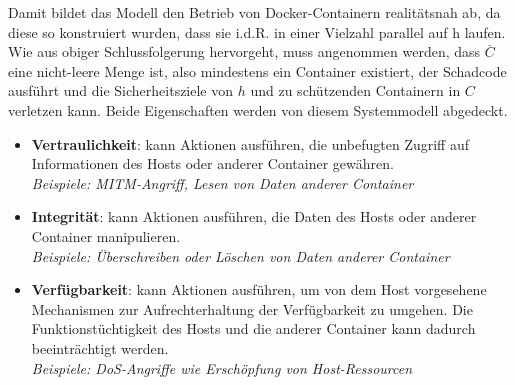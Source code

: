 \documentclass[../main.tex]{subfiles}
\begin{document}
    Damit bildet das Modell den Betrieb von Docker-Containern realitätsnah ab, da diese so konstruiert wurden, dass sie i.d.R. in einer Vielzahl parallel auf h laufen. Wie aus obiger Schlussfolgerung hervorgeht, muss angenommen werden, dass \(\overline{C}\) eine nicht-leere Menge ist, also mindestens ein Container \cbroken{} existiert, der Schadcode ausführt und die Sicherheitsziele von \(h\) und zu schützenden Containern in \(C\) verletzen kann. Beide Eigenschaften werden von diesem Systemmodell abgedeckt.





    \begin{itemize}
      \item \textbf{Vertraulichkeit}: \cbroken{} kann Aktionen ausführen, die unbefugten Zugriff auf Informationen des Hosts oder anderer Container gewähren.\\
      \emph{Beispiele: MITM-Angriff, Lesen von Daten anderer Container}
      \item \textbf{Integrität}: \cbroken{} kann Aktionen ausführen, die Daten des Hosts oder anderer Container manipulieren.\\
      \emph{Beispiele: Überschreiben oder Löschen von Daten anderer Container}
      \item \textbf{Verfügbarkeit}: \cbroken{} kann Aktionen ausführen, um von dem Host vorgesehene Mechanismen zur Aufrechterhaltung der Verfügbarkeit zu umgehen. Die Funktionstüchtigkeit des Hosts und die anderer Container kann dadurch beeinträchtigt werden.\\
      \emph{Beispiele: DoS-Angriffe wie Erschöpfung von Host-Ressourcen}
    \end{itemize}
\end{document}
